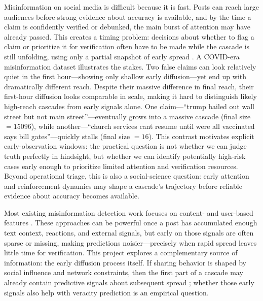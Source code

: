 
Misinformation on social media is difficult because it is fast. Posts can reach large audiences before strong evidence about accuracy is available, and by the time a claim is confidently verified or debunked, the main burst of attention may have already passed. This creates a timing problem: decisions about whether to flag a claim or prioritize it for verification often have to be made while the cascade is still unfolding, using only a partial snapshot of early spread \citep{colbaugh_earlywarning_2012}. A COVID-era misinformation dataset illustrates the stakes. Two false claims can look relatively quiet in the first hour—showing only shallow early diffusion—yet end up with dramatically different reach. Despite their massive difference in final reach, their first-hour diffusion looks comparable in scale, making it hard to distinguish likely high-reach cascades from early signals alone. One claim—“trump bailed out wall street but not main street”—eventually grows into a massive cascade (final size $=15096$), while another—“church services cant resume until were all vaccinated says bill gates”—quickly stalls (final size $=16$). This contrast motivates explicit early-observation windows: the practical question is not whether we can judge truth perfectly in hindsight, but whether we can identify potentially high-risk cases early enough to prioritize limited attention and verification resources. Beyond operational triage, this is also a social-science question: early attention and reinforcement dynamics may shape a cascade's trajectory before reliable evidence about accuracy becomes available. 


Most existing misinformation detection work focuses on content- and user-based features \citep{shu_fake_2017,zubiaga_detection_2018}. These approaches can be powerful once a post has accumulated enough text context, reactions, and external signals, but early on those signals are often sparse or missing, making predictions noisier---precisely when rapid spread leaves little time for verification. This project explores a complementary source of information: the early diffusion process itself. If sharing behavior is shaped by social influence and network constraints, then the first part of a cascade may already contain predictive signals about subsequent spread \citep{szabo_predicting_2010,cheng_can_2014}; whether those early signals also help with veracity prediction is an empirical question.

